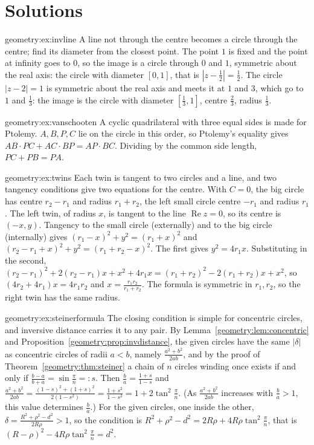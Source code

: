 \section{Solutions}

\begin{solution}{geometry:ex:invline}
\idea A line not through the centre becomes a circle through the centre; find its diameter from the closest point.
\writeup The point $1$ is fixed and the point at infinity goes to $0$, so the image is a circle through $0$ and $1$, symmetric about the real axis:
the circle with diameter $[0,1]$, that is $|z-\frac12|=\frac12$. The circle $|z-2|=1$ is symmetric about the real axis and meets it at $1$ and $3$,
which go to $1$ and $\frac13$: the image is the circle with diameter $[\frac13,1]$, centre $\frac23$, radius $\frac13$.
\end{solution}

\begin{solution}{geometry:ex:vanschooten}
\idea A cyclic quadrilateral with three equal sides is made for Ptolemy.
\writeup $A,B,P,C$ lie on the circle in this order, so Ptolemy's equality gives $AB\cdot PC+AC\cdot BP=AP\cdot BC$. Dividing by the common side
length, $PC+PB=PA$.
\end{solution}

\begin{solution}{geometry:ex:twins}
\idea Each twin is tangent to two circles and a line, and two tangency conditions give two equations for the centre.
\writeup With $C=0$, the big circle has centre $r_2-r_1$ and radius $r_1+r_2$, the left small circle centre $-r_1$ and radius $r_1$. The left twin,
of radius $x$, is tangent to the line $\operatorname{Re}z=0$, so its centre is $(-x,y)$. Tangency to the small circle (externally) and to the big
circle (internally) gives $(r_1-x)^2+y^2=(r_1+x)^2$ and $(r_2-r_1+x)^2+y^2=(r_1+r_2-x)^2$. The first gives $y^2=4r_1x$. Substituting in the second,
$(r_2-r_1)^2+2(r_2-r_1)x+x^2+4r_1x=(r_1+r_2)^2-2(r_1+r_2)x+x^2$, so $(4r_2+4r_1)x=4r_1r_2$ and $x=\frac{r_1r_2}{r_1+r_2}$. The formula is symmetric
in $r_1,r_2$, so the right twin has the same radius.
\end{solution}

\begin{solution}{geometry:ex:steinerformula}
\idea The closing condition is simple for concentric circles, and inversive distance carries it to any pair.
\writeup By Lemma~\ref{geometry:lem:concentric} and Proposition~\ref{geometry:prop:invdistance}, the given circles have the same $|\delta|$ as concentric circles of radii
$a<b$, namely $\frac{a^2+b^2}{2ab}$, and by the proof of Theorem~\ref{geometry:thm:steiner} a chain of $n$ circles winding once exists if and only if
$\frac{b-a}{b+a}=\sin\frac\pi n=:s$. Then $\frac ba=\frac{1+s}{1-s}$ and $\frac{a^2+b^2}{2ab}=\frac{(1-s)^2+(1+s)^2}{2(1-s^2)}=\frac{1+s^2}{1-s^2}=1+2\tan^2\frac\pi n$.
(As $\frac{a^2+b^2}{2ab}$ increases with $\frac ba>1$, this value determines $\frac ba$.) For the given circles, one inside the other, $\delta=
\frac{R^2+\rho^2-d^2}{2R\rho}>1$, so the condition is $R^2+\rho^2-d^2=2R\rho+4R\rho\tan^2\frac\pi n$, that is $(R-\rho)^2-4R\rho\tan^2\frac\pi n=d^2$.
\end{solution}

